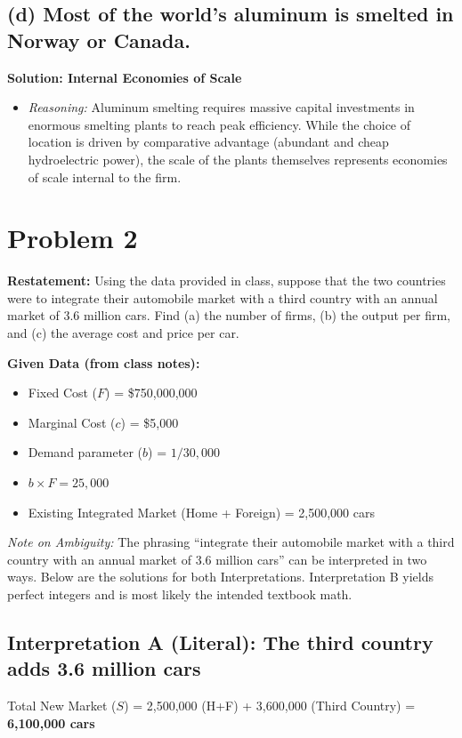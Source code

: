 \documentclass[11pt, letterpaper]{article}
\begin{document}
\subsection*{(d) Most of the world's aluminum is smelted in Norway or Canada.}
\noindent \textbf{Solution: Internal Economies of Scale}
\begin{itemize}
  \item \textit{Reasoning:} Aluminum smelting requires massive capital investments in enormous smelting plants to reach peak efficiency. While the choice of location is driven by comparative advantage (abundant and cheap hydroelectric power), the scale of the plants themselves represents economies of scale internal to the firm.
\end{itemize}

\vspace{1em}
\section*{Problem 2}

\textbf{Restatement:} Using the data provided in class, suppose that the two countries were to integrate their automobile market with a third country with an annual market of 3.6 million cars. Find (a) the number of firms, (b) the output per firm, and (c) the average cost and price per car.

\vspace{0.5em}
\noindent \textbf{Given Data (from class notes):}
\begin{itemize}
  \item Fixed Cost ($F$) = \$750,000,000
  \item Marginal Cost ($c$) = \$5,000
  \item Demand parameter ($b$) = $1 / 30,000$
  \item $b \times F = 25,000$
  \item Existing Integrated Market (Home + Foreign) = 2,500,000 cars
\end{itemize}

\noindent \textit{Note on Ambiguity:} The phrasing ``integrate their automobile market with a third country with an annual market of 3.6 million cars'' can be interpreted in two ways. Below are the solutions for both Interpretations. Interpretation B yields perfect integers and is most likely the intended textbook math.

\subsection*{Interpretation A (Literal): The third country adds 3.6 million cars}
Total New Market ($S$) = 2,500,000 (H+F) + 3,600,000 (Third Country) = \textbf{6,100,000 cars}
\end{document}
